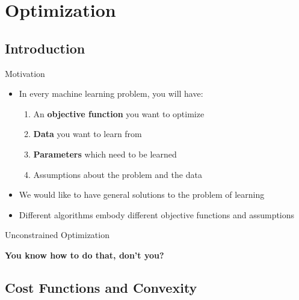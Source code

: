 \section{Optimization}

\subsection{Introduction}

\begin{frame}{Motivation}{}
	\begin{itemize}
		\item In every machine learning problem, you will have:
		\begin{enumerate}
			\item An \textbf{objective function} you want to optimize
			\item \textbf{Data} you want to learn from
			\item \textbf{Parameters} which need to be learned
			\item Assumptions about the problem and the data
		\end{enumerate}
		\item We would like to have general solutions to the problem of learning
		\item Different algorithms embody different objective functions and assumptions
	\end{itemize}

	\begin{boxBlueNoFrame}
	\end{boxBlueNoFrame}
\end{frame}


\begin{frame}{Unconstrained Optimization}{}
	\vfill
	\begin{center}
		\large\textbf{You know how to do that, don't you?}
	\end{center}
	\vfill
\end{frame}


\subsection{Cost Functions and Convexity}

